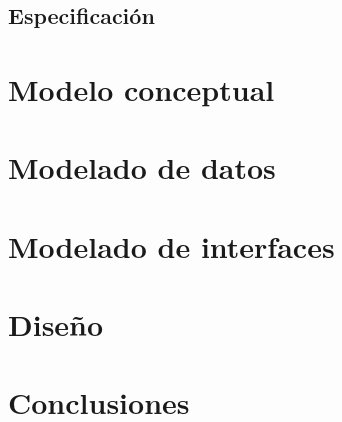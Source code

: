 \documentclass{\ClassPath/viu-tfm-template}
\begin{document}
\section{Especificación}

\chapter{Modelo conceptual}

\chapter{Modelado de datos}

\chapter{Modelado de interfaces}

\chapter{Diseño}


\chapter{Conclusiones}


\printbibliography[title={Referencias bibliográficas},heading=bibintoc]
\end{document}
